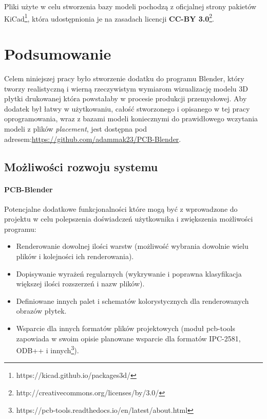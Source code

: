 \documentclass[brudnopis]{xmgr}
\begin{document}
\vspace{5mm}
\noindent Pliki użyte w celu stworzenia bazy modeli pochodzą z oficjalnej strony pakietów KiCad\footnote{https://kicad.github.io/packages3d/}, która udostępnionia je na zasadach licencji \textbf{CC-BY 3.0}\footnote{http://creativecommons.org/licenses/by/3.0/}.
\vspace{5mm}



\chapter{Podsumowanie}
Celem niniejszej pracy było stworzenie dodatku do programu Blender, który tworzy realistyczną i wierną rzeczywistym wymiarom wizualizację modelu 3D płytki drukowanej która powstałaby w procesie produkcji przemysłowej.
Aby dodatek był łatwy w użytkowaniu, całość stworzonego i opisanego w tej pracy oprogramowania, wraz z bazami modeli koniecznymi do prawidłowego wczytania modeli z plików \emph{placement}, jest dostępna pod adresem:\newline\url{https://github.com/adammak23/PCB-Blender}.


\section{Możliwości rozwoju systemu}
\subsubsection{PCB-Blender}
Potencjalne dodatkowe funkcjonalności które mogą być z wprowadzone do projektu w celu polepszenia doświadczeń użytkownika i zwiększenia możliwości programu:
\begin{itemize}
\item Renderowanie dowolnej ilości warstw (możliwość wybrania dowolnie wielu plików i kolejności ich renderowania).
\item Dopisywanie wyrażeń regularnych (wykrywanie i poprawna klasyfikacja większej ilości rozszerzeń i nazw plików).
\item Definiowane innych palet i schematów kolorystycznych dla renderowanych obrazów płytek.
\item Wsparcie dla innych formatów plików projektowych (moduł pcb-tools zapowiada w swoim opisie planowane wsparcie dla formatów IPC-2581, ODB++ i innych\footnote{https://pcb-tools.readthedocs.io/en/latest/about.html}).
\end{itemize}
\end{document}
